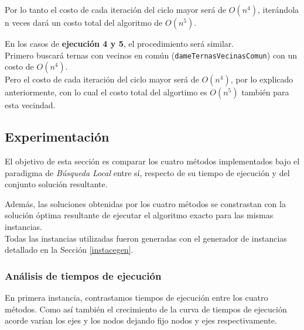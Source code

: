 Por lo tanto el costo de cada iteraci\'on del ciclo mayor ser\'a de $O(n^4)$, iter\'andola n veces dar\'a un costo total del algoritmo de $O(n^5)$.\\

\newpage

En los casos de \textbf{ejecuci\'on 4 y 5}, el procedimiento ser\'a similar.\\

Primero buscar\'a ternas con vecinos en com\'un (\texttt{dameTernasVecinasComun}) con un costo de $O(n^4)$.\\

Pero el costo de cada iteraci\'on del ciclo mayor ser\'a de $O(n^4)$, por lo explicado anteriormente, con lo cual el costo total del algortimo es $O(n^5)$ tambi\'en para esta vecindad. 


\newpage
\subsection{Experimentaci\'on}

El objetivo de esta secci\'on es comparar los cuatro m\'etodos implementados bajo el paradigma de \emph{B\'usqueda Local} entre s\'i, respecto de su tiempo de ejecuci\'on y del conjunto soluci\'on resultante.

Adem\'as, las soluciones obtenidas por los cuatro m\'etodos se constrastan con la soluci\'on \'optima resultante de ejecutar el algoritmo exacto para las mismas instancias.\\

Todas las instancias utilizadas fueron generadas con el generador de instancias detallado en la Secci\'on \ref{instacegen}.

\subsubsection{An\'alisis de tiempos de ejecuci\'on}\label{tiempos}

En primera instancia, contrastamos tiempos de ejecuci\'on entre los cuatro m\'etodos. Como as\'i tambi\'en el crecimiento de la curva de tiempos de ejecuci\'on acorde var\'ian los ejes y los nodos dejando fijo nodos y ejes respectivamente.

